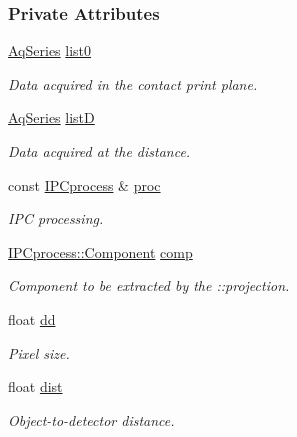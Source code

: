 \subsubsection*{Private Attributes}
\begin{DoxyCompactItemize}
\item 
\hyperlink{classAqSeries}{AqSeries} \hyperlink{classIPCexp_ae4dd5b05e0043fced323a7c82482241b}{list0}
\begin{DoxyCompactList}\small\item\em Data acquired in the contact print plane. \item\end{DoxyCompactList}\item 
\hyperlink{classAqSeries}{AqSeries} \hyperlink{classIPCexp_a2de69c106bac7e655eff375d837db93f}{listD}
\begin{DoxyCompactList}\small\item\em Data acquired at the distance. \item\end{DoxyCompactList}\item 
const \hyperlink{classIPCprocess}{IPCprocess} \& \hyperlink{classIPCexp_af58ae99f8445d3dfc9e116314a2dc1c6}{proc}
\begin{DoxyCompactList}\small\item\em IPC processing. \item\end{DoxyCompactList}\item 
\hyperlink{classIPCprocess_a9e159369437f40cc3340171a0f6d3418}{IPCprocess::Component} \hyperlink{classIPCexp_a621664c85d0c48010d21b89b7b688e81}{comp}
\begin{DoxyCompactList}\small\item\em Component to be extracted by the ::projection. \item\end{DoxyCompactList}\item 
float \hyperlink{classIPCexp_a3fdffdc3857421b3e001e3f8e69a24b7}{dd}
\begin{DoxyCompactList}\small\item\em Pixel size. \item\end{DoxyCompactList}\item 
float \hyperlink{classIPCexp_ad564518ff232c38ac771849736022fd1}{dist}
\begin{DoxyCompactList}\small\item\em Object-\/to-\/detector distance. \item\end{DoxyCompactList}\item 

\end{DoxyCompactItemize}
